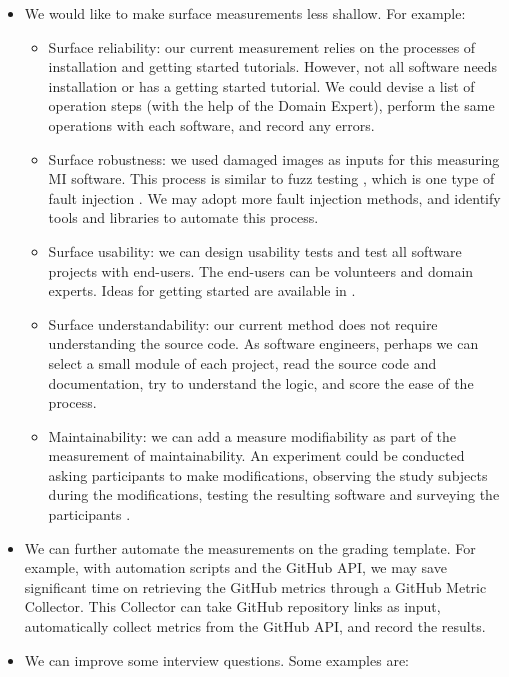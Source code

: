 \documentclass[final, 12pt, 3p, times]{elsarticle}
\begin{document}
\begin{itemize}
    \item We would like to make surface measurements less shallow. For example:
    \begin{itemize}
        \item Surface reliability: our current measurement relies on the
        processes of installation and getting started tutorials. However, not
        all software needs installation or has a getting started tutorial. We
        could devise a list of operation steps (with the help of the Domain
        Expert), perform the same operations with each software, and record any
        errors.
        \item Surface robustness: we used damaged images as inputs for this
        measuring MI software. This process is similar to fuzz testing
        \cite{enwiki:1039424308}, which is one type of fault injection
        \cite{enwiki:1039005082}. We may adopt more fault injection methods,
        and identify tools and libraries to automate this process.
        \item Surface usability: we can design usability tests and test all
        software projects with end-users. The end-users can be volunteers and
        domain experts. Ideas for getting started are available in
        \cite{SmithEtAl2021}.
        \item Surface understandability: our current method does not require
        understanding the source code. As software engineers, perhaps we can
        select a small module of each project, read the source code and
        documentation, try to understand the logic, and score the ease of the
        process.  
        \item Maintainability: we can add a measure modifiability as part of the
        measurement of maintainability.  An experiment could be conducted asking
        participants to make modifications, observing the study subjects during
        the modifications, testing the resulting software and surveying the
        participants \cite{SmithEtAl2021}.
    \end{itemize}
	\item We can further automate the measurements on the grading template. For
	example, with automation scripts and the GitHub API, we may save significant
	time on retrieving the GitHub metrics through a GitHub Metric Collector.
	This Collector can take GitHub repository links as input, automatically
	collect metrics from the GitHub API, and record the results.
	\item We can improve some interview questions. Some examples are:

\end{itemize}
\end{document}
